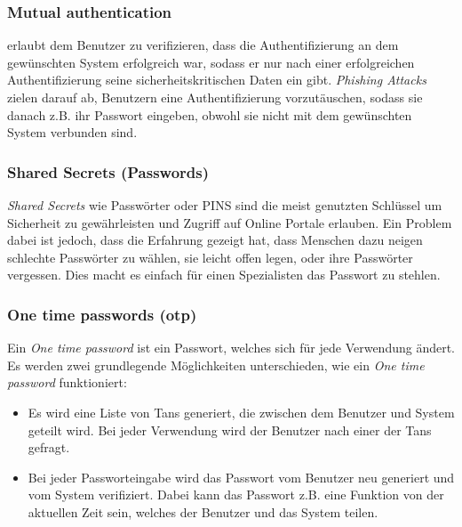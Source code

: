 \subsubsection{Mutual authentication}
erlaubt dem Benutzer zu verifizieren, dass die Authentifizierung an dem gewünschten System erfolgreich war, sodass er nur nach einer erfolgreichen Authentifizierung seine sicherheitskritischen Daten ein gibt. \textit{Phishing Attacks} zielen darauf ab, Benutzern eine Authentifizierung  vorzutäuschen, sodass sie danach z.B. ihr Passwort eingeben, obwohl sie nicht mit dem gewünschten System verbunden sind.


\subsubsection{Shared Secrets (Passwords)}
\textit{Shared Secrets} wie Passwörter oder PINS sind die meist genutzten Schlüssel um Sicherheit zu gewährleisten und Zugriff auf Online Portale erlauben. Ein Problem dabei ist jedoch, dass die Erfahrung gezeigt hat, dass Menschen dazu neigen schlechte Passwörter zu wählen, sie leicht offen legen, oder ihre Passwörter vergessen. Dies macht es einfach für einen Spezialisten das Passwort zu stehlen. 
\subsubsection{One time passwords (otp)}
Ein \textit{One time password} ist ein Passwort, welches sich für jede Verwendung ändert. Es werden zwei grundlegende Möglichkeiten unterschieden, wie ein \textit{One time password} funktioniert:
\begin{itemize}
\item Es wird eine Liste von Tans generiert, die zwischen dem Benutzer und System geteilt wird. Bei jeder Verwendung wird der Benutzer nach einer der Tans gefragt.
\item Bei jeder Passworteingabe wird das Passwort vom Benutzer neu generiert und vom System verifiziert. Dabei kann das Passwort z.B. eine Funktion von der aktuellen Zeit sein, welches der Benutzer und das System teilen.
\end{itemize}
